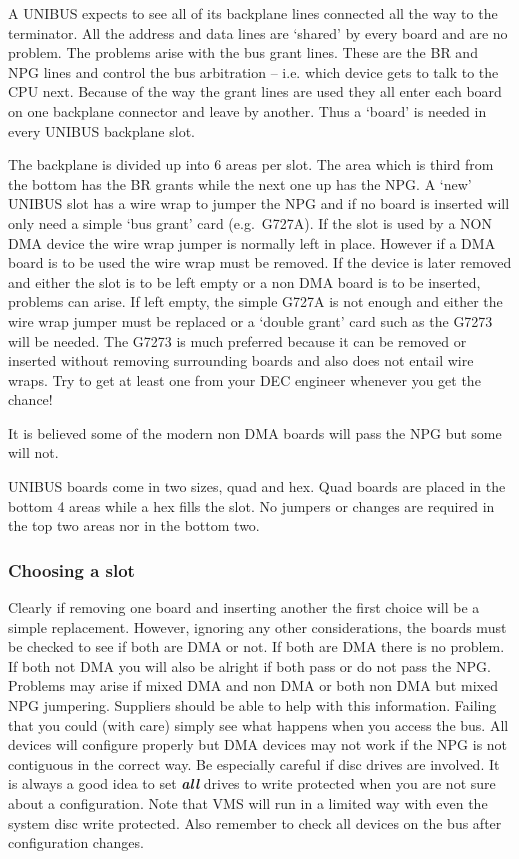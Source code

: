 A UNIBUS expects to see all of its backplane lines connected all
 the way to the terminator.
All the address and data lines are `shared' by every board and are no problem.
The problems arise with the bus grant lines.
These are the BR and NPG lines and control the bus arbitration -- i.e. which
 device gets to talk to the CPU next.
Because of the way the grant lines are
 used they all enter each board on one backplane connector and leave by another.
 Thus a `board' is needed in every UNIBUS backplane slot.

The backplane is divided up into 6 areas per slot.
The area which is
 third from the bottom has the BR grants while the next one up has the NPG.
 A `new' UNIBUS slot has a wire wrap to jumper the NPG and if no board is
 inserted will only need a simple `bus grant' card (e.g.\ G727A).
If the slot
 is used by a NON DMA device the wire wrap jumper is normally left in place.
 However if a DMA board is to be used the wire wrap must be removed.
If the device is later removed and either the slot is to be left empty or
a non DMA board is to be inserted, problems can arise.
If left empty, the simple G727A is not enough and either the wire wrap jumper
must be replaced or a `double grant' card such as the G7273 will be needed.
The G7273 is much  preferred because it can be removed or inserted
without removing surrounding boards and also does not entail wire wraps.
Try to get at least one from your DEC engineer whenever you get the chance!

It is believed some of the modern non DMA boards will pass the NPG but
some will not.

UNIBUS boards come in two sizes, quad and hex.
Quad boards are placed in the bottom 4 areas while a hex fills the slot.
No jumpers or changes are required in the top two areas nor in the bottom two.

\subsubsection{Choosing a slot}

Clearly if removing one board and inserting another the
first  choice will be a simple replacement.
However, ignoring any other considerations, the boards must be checked to 
see if both are DMA or not.
If both are DMA there is no problem.
If both not DMA you will also be alright if both  pass or do not pass the NPG.
 Problems may arise if mixed DMA and non DMA or both non DMA but mixed NPG 
jumpering.
Suppliers should be able to help with this information.
Failing that you could (with care) simply see what happens when you access
the bus.
All devices will configure properly  but DMA devices may not work if the 
NPG is not contiguous in the correct way.
Be especially  careful if disc drives are involved.
It is always a good idea to set {\bf \it all}  drives to write protected when
you are not sure about a configuration.
Note that VMS will run in a limited way with even the system disc write
protected.
Also remember to check all devices on the bus after configuration changes.

